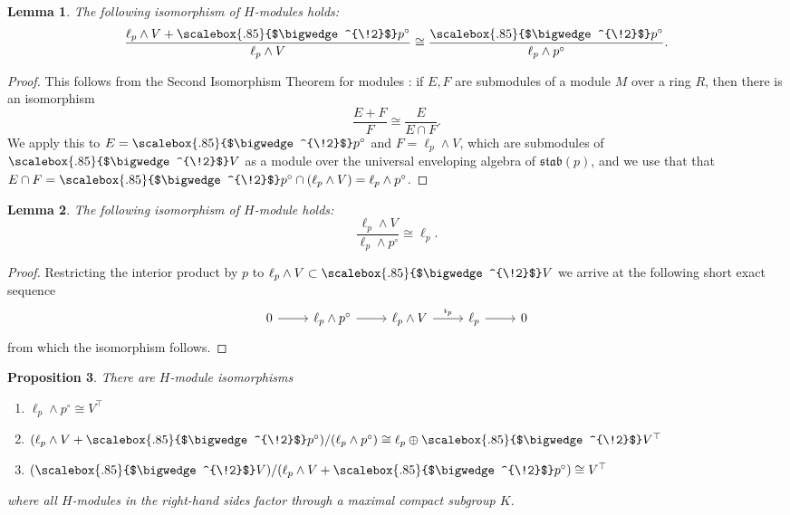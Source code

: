 \documentclass[11pt,reqno,a4paper,final]{amsart}
\newcommand\ext[1]{\scalebox{.85}{$\bigwedge^{\!#1}$}}
\theoremstyle{plain}
\newtheorem{lemma}{Lemma}
\newtheorem{proposition}[lemma]{Proposition}
\theoremstyle{definition}
\newcommand{\stab}{\mathfrak{stab}}
\newcommand{\1}{\mathbb{1}}
\numberwithin{equation}{section}
\begin{document}
\begin{lemma}
  \label{lem:module-iso}
  The following isomorphism of $H$-modules holds:
  \begin{equation}
    \dfrac{\ell_p \wedge V + \ext{2} p^\circ}{\ell_p \wedge V} \cong \dfrac{\ext{2}p^\circ}{\ell_p \wedge p^\circ}.
  \end{equation}
\end{lemma}

\begin{proof}
  This follows from the Second Isomorphism Theorem for modules
  \cite[Theorem~4(2), Section~10.2]{DummitFoote}: if $E,F$ are
  submodules of a module $M$ over a ring $R$, then there is an
  isomorphism
  \begin{equation}
    \dfrac{E + F}{F} \cong \dfrac{E}{E \cap F}.
  \end{equation}
  We apply this to $E = \ext{2}p^\circ$ and $F = \ell_p \wedge V$, which are
  submodules of $\ext{2}V$ as a module over the universal enveloping
  algebra of $\stab(p)$, and we use that that $E \cap F =
  \ext{2}p^\circ \cap (\ell_p \wedge V) = \ell_p \wedge p^\circ$.
\end{proof}

\begin{lemma}
  \label{lem:another-module-iso}
  The following isomorphism of $H$-module holds:
  \begin{equation}
    \dfrac{\ell_p \wedge V}{\ell_p \wedge p^\circ} \cong \ell_p.
  \end{equation}
\end{lemma}

\begin{proof}
  Restricting the interior product by $p$ to $\ell_p \wedge V \subset
  \ext{2}V$ we arrive at the following short exact sequence
  \begin{equation}
    \begin{tikzcd}
      0 \arrow[r] & \ell_p \wedge p^\circ \arrow[r] & \ell_p \wedge V  \arrow[r,"\imath_p"] & \ell_p \arrow[r] & 0
    \end{tikzcd}
  \end{equation}
  from which the isomorphism follows.
\end{proof}

\begin{proposition}
  \label{prop:stabp-module-isos}
  There are $H$-module isomorphisms
  \begin{enumerate}
  \item $\ell_p \wedge p^\circ \cong V^\top$
  \item $(\ell_p \wedge V + \ext{2}p^\circ)/(\ell_p \wedge p^\circ) \cong  \ell_p  \oplus \ext{2}V^\top$
  \item $(\ext{2}V)/(\ell_p \wedge V + \ext{2}p^\circ) \cong V^\top$
  \end{enumerate}
  where all $H$-modules in the right-hand sides factor through
  a maximal compact subgroup $K$.
\end{proposition}
\end{document}
